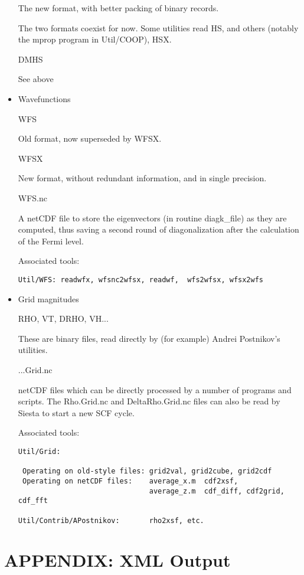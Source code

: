 \documentclass[11pt]{article}
\begin{document}
\begin{itemize}
The new format, with better packing of binary records.

The two formats coexist for now. Some utilities read HS, and others
(notably the mprop program in Util/COOP), HSX.

DMHS

See above

\item{Wavefunctions}

WFS

Old format, now superseded by WFSX.

WFSX

New format, without redundant information, and in single precision.

WFS.nc

A netCDF file to store the eigenvectors (in routine diagk\_file) as they
are computed, thus saving a second round of diagonalization after the
calculation of the Fermi level.

Associated tools:
\begin{verbatim}
Util/WFS: readwfx, wfsnc2wfsx, readwf,  wfs2wfsx, wfsx2wfs
\end{verbatim}

\item{Grid magnitudes}

RHO, VT, DRHO, VH...

These are binary files, read directly by (for example) Andrei
Postnikov's utilities.

...Grid.nc

netCDF files which can be directly processed by a number of programs
and scripts.  The Rho.Grid.nc and DeltaRho.Grid.nc files can also be
read by Siesta to start a new SCF cycle.

Associated tools:

\begin{verbatim}
Util/Grid:

 Operating on old-style files: grid2val, grid2cube, grid2cdf
 Operating on netCDF files:    average_x.m	cdf2xsf,
                               average_z.m  cdf_diff, cdf2grid, cdf_fft

Util/Contrib/APostnikov:       rho2xsf, etc.

\end{verbatim}
\end{itemize}

\newpage
\section{APPENDIX: XML Output}
\end{document}
